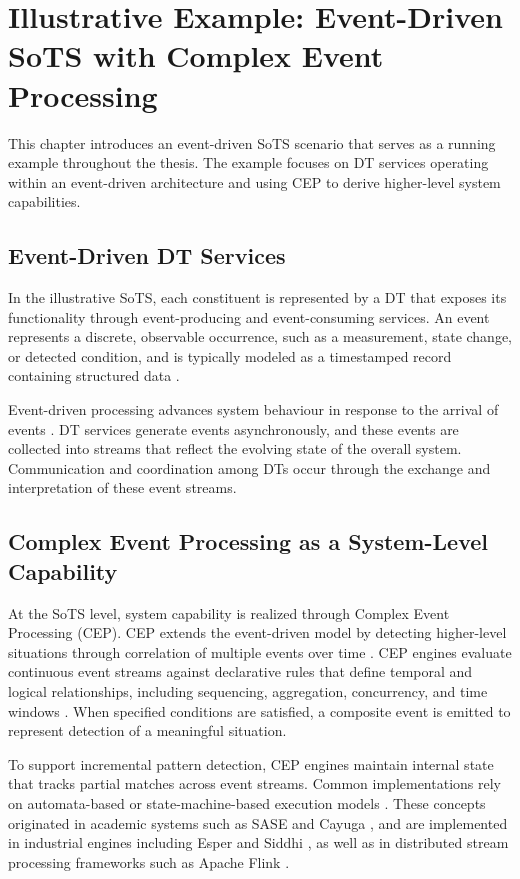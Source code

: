 \chapter{Illustrative Example: Event-Driven SoTS with Complex Event Processing}\label{ch:example}

This chapter introduces an event-driven SoTS scenario that serves as a running example throughout the thesis. The example focuses on DT services operating within an event-driven architecture and using CEP to derive higher-level system capabilities.

\section{Event-Driven DT Services}

In the illustrative SoTS, each constituent is represented by a DT that exposes its functionality through event-producing and event-consuming services. An event represents a discrete, observable occurrence, such as a measurement, state change, or detected condition, and is typically modeled as a timestamped record containing structured data \cite{etzion2010event}.

Event-driven processing advances system behaviour in response to the arrival of events \cite{kommera2020power}. DT services generate events asynchronously, and these events are collected into streams that reflect the evolving state of the overall system. Communication and coordination among DTs occur through the exchange and interpretation of these event streams.

\section{Complex Event Processing as a System-Level Capability}

At the SoTS level, system capability is realized through Complex Event Processing (CEP). CEP extends the event-driven model by detecting higher-level situations through correlation of multiple events over time \cite{cugola2015complex}. CEP engines evaluate continuous event streams against declarative rules that define temporal and logical relationships, including sequencing, aggregation, concurrency, and time windows \cite{cugola2012processing,cugola2015complex}. When specified conditions are satisfied, a composite event is emitted to represent detection of a meaningful situation.

To support incremental pattern detection, CEP engines maintain internal state that tracks partial matches across event streams. Common implementations rely on automata-based or state-machine-based execution models \cite{cugola2015complex}. These concepts originated in academic systems such as SASE and Cayuga \cite{wu2006high,brenna2007cayuga}, and are implemented in industrial engines including Esper and Siddhi \cite{esper_reference,suhothayan2011siddhi}, as well as in distributed stream processing frameworks such as Apache Flink \cite{carbone2015apache,dayarathna2018recent}.
